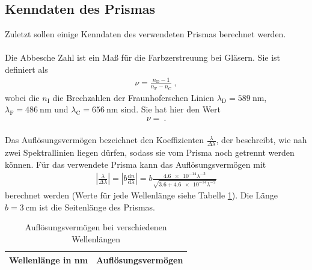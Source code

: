\subsection{Kenndaten des Prismas\label{sec:Kenndaten}}
Zuletzt sollen einige Kenndaten des verwendeten Prismas berechnet werden. \\
\ \\
Die Abbesche Zahl ist ein Maß für die Farbzerstreuung bei Gläsern. Sie ist definiert als
\begin{align}
	\nu = \frac{n_\text{D}-1}{n_\text{F}-n_\text{C}} \ ,
\end{align}
wobei die $n_\text{I}$ die Brechzahlen der Fraunhoferschen Linien $\lambda_\text{D} = \SI{589}{\nano\meter}$, $\lambda_\text{F} = \SI{486}{\nano\meter}$ und $\lambda_\text{C} = \SI{656}{\nano\meter}$ sind. Sie hat hier den Wert
\begin{align}
	\nu =  \ .
\end{align}
\ \\
Das Auflösungsvermögen bezeichnet den Koeffizienten $\frac{\lambda}{\Delta\lambda}$, der beschreibt, wie nah zwei Spektrallinien liegen dürfen, sodass sie vom Prisma noch getrennt werden können. Für das verwendete Prisma kann das Auflösungsvermögen mit
\begin{align*}
	\left|\frac{\lambda}{\Delta\lambda}\right| = \left|b\frac{\text{d}n}{\text{d}\lambda}\right| = b\frac{\SI{4.6e-14}\lambda^{-3}}{\sqrt{3.6+\SI{4.6e-14}\lambda^{-2}}}
\end{align*}
berechnet werden (Werte für jede Wellenlänge siehe Tabelle \ref{tab:Aufl}). Die Länge $b=\SI{3}{\centi\meter}$ ist die Seitenlänge des Prismas.
\begin{table}[h!]
	\centering
	\begin{tabular}{c|c}
		Wellenlänge in \si{\nano\meter} & Auflösungsvermögen \\
		\hline
		
	\end{tabular}
	\caption{Auflösungsvermögen bei verschiedenen Wellenlängen}
	\label{tab:Aufl}
\end{table}

